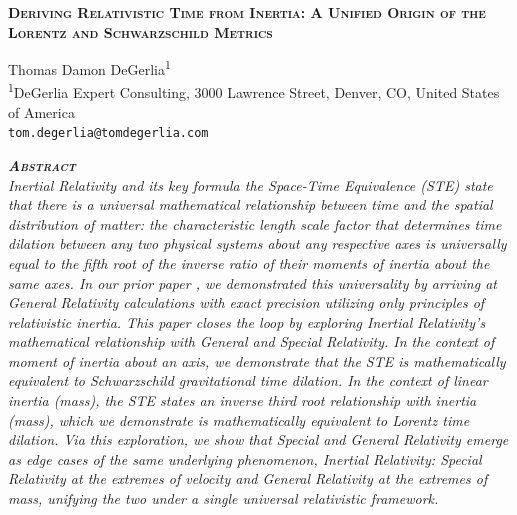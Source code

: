 \documentclass[a4paper,11pt]{article}
\begin{document}
\begin{center}
{\fontsize{20}{24}\selectfont\bfseries\scshape Deriving Relativistic Time from Inertia: A Unified Origin of the Lorentz and Schwarzschild Metrics}
\vspace{24pt}

{\fontsize{13}{15}\selectfont Thomas Damon DeGerlia\textsuperscript{1}}\\[12pt]

{\fontsize{12}{14}\selectfont \textsuperscript{1}DeGerlia Expert Consulting, 3000 Lawrence Street, Denver, CO, United States of America}\\
{\fontsize{10}{12}\selectfont\texttt{tom.degerlia@tomdegerlia.com}}\\[18pt]
\end{center}

{\fontsize{13}{15}\selectfont\bfseries\itshape\scshape Abstract}\\[6pt]
{\fontsize{10}{12}\selectfont\itshape
Inertial Relativity and its key formula the Space-Time Equivalence (STE) \cite{degerlia2025universe} state that there is a universal mathematical relationship between time and the spatial distribution of matter: the characteristic length scale factor that determines time dilation between any two physical systems about any respective axes is universally equal to the fifth root of the inverse ratio of their moments of inertia about the same axes. In our prior paper \cite{degerlia2025}, we demonstrated this universality by arriving at General Relativity calculations with exact precision utilizing only principles of relativistic inertia. This paper closes the loop by exploring Inertial Relativity's mathematical relationship with General and Special Relativity. In the context of moment of inertia about an axis, we demonstrate that the STE is mathematically equivalent to Schwarzschild gravitational time dilation. In the context of linear inertia (mass), the STE states an inverse third root relationship with inertia (mass), which we demonstrate is mathematically equivalent to Lorentz time dilation. Via this exploration, we show that Special and General Relativity emerge as edge cases of the same underlying phenomenon, Inertial Relativity: Special Relativity at the extremes of velocity and General Relativity at the extremes of mass, unifying the two under a single universal relativistic framework.
}\\[12pt]
\end{document}
